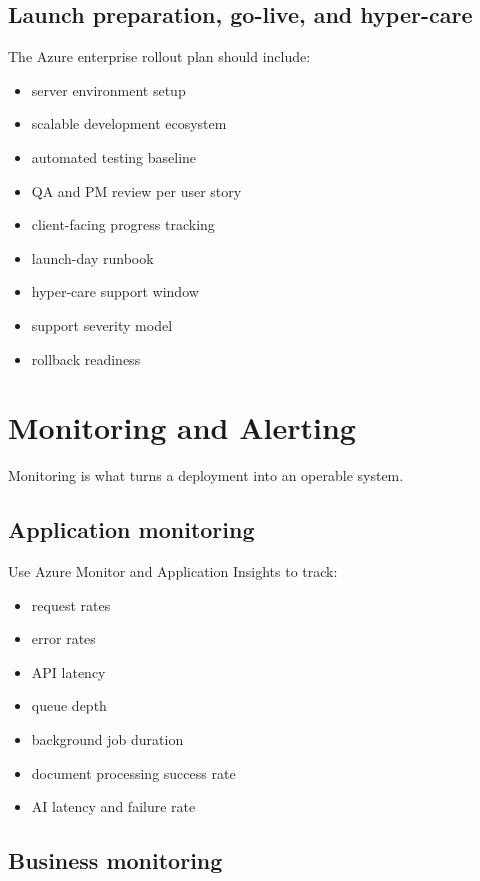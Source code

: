 \documentclass[11pt]{article}
\begin{document}
\subsection{Launch preparation, go-live, and hyper-care}

The Azure enterprise rollout plan should include:

\begin{itemize}
\item server environment setup
\item scalable development ecosystem
\item automated testing baseline
\item QA and PM review per user story
\item client-facing progress tracking
\item launch-day runbook
\item hyper-care support window
\item support severity model
\item rollback readiness
\end{itemize}

\section{Monitoring and Alerting}

Monitoring is what turns a deployment into an operable system.

\subsection{Application monitoring}

Use Azure Monitor and Application Insights to track:

\begin{itemize}
\item request rates
\item error rates
\item API latency
\item queue depth
\item background job duration
\item document processing success rate
\item AI latency and failure rate
\end{itemize}

\subsection{Business monitoring}
\end{document}
